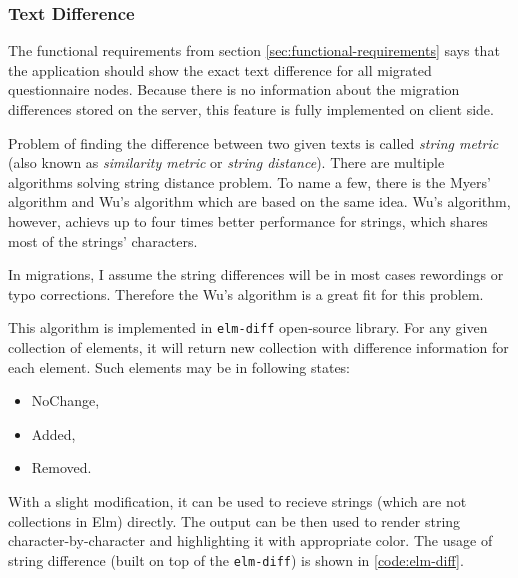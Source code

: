 \subsubsection*{Text Difference}

The functional requirements from section \ref{sec:functional-requirements} says that the application should show the exact text difference for all migrated questionnaire nodes.
Because there is no information about the migration differences stored on the server, this feature is fully implemented on client side.

Problem of finding the difference between two given texts is called \textit{string metric} (also known as \textit{similarity metric} or \textit{string distance})\cite{wiki-string-metric}.
There are multiple algorithms solving string distance problem.
To name a few, there is the Myers' algorithm\cite{art-myer} and Wu's algorithm\cite{art-wu} which are based on the same idea.
Wu's algorithm, however, achievs up to four times better performance for strings, which shares most of the strings' characters.

In migrations, I assume the string differences will be in most cases rewordings or typo corrections.
Therefore the Wu's algorithm is a great fit for this problem.

This algorithm is implemented in \texttt{elm-diff}\cite{epkg-elm-diff} open-source library.
For any given collection of elements, it will return new collection with difference information for each element.
Such elements may be in following states:

\begin{itemize}
    \item NoChange,
    \item Added,
    \item Removed.
\end{itemize}

With a slight modification, it can be used to recieve strings (which are not collections in Elm) directly.
The output can be then used to render string character-by-character and highlighting it with appropriate color.
The usage of string difference (built on top of the \texttt{elm-diff}) is shown in \ref{code:elm-diff}.

